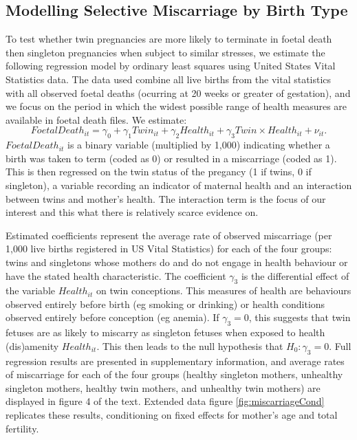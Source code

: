 \documentclass{nature}
\begin{document}
\begin{linenumbers}
\subsection{Modelling Selective Miscarriage by Birth Type}
To test whether twin  pregnancies are more likely to terminate in foetal death then singleton pregnancies when subject to similar stresses, we estimate the following regression model by ordinary least squares using United States Vital Statistics data.  The data used combine all live births from the vital statistics with all observed foetal deaths (ocurring at 20 weeks or greater of gestation), and we focus on the period in which the widest possible range of health measures are available in foetal death files.  We estimate:
\begin{equation}
FoetalDeath_{it} = \gamma_0 + \gamma_1 Twin_{it} + \gamma_2 Health_{it} + \gamma_3 Twin\times Health_{it} + \nu_{it}.
\end{equation}
$FoetalDeath_{it}$ is a binary variable (multiplied by 1,000) indicating whether a birth was taken to term (coded as 0) or resulted in a miscarriage (coded as 1). This is then regressed on the twin status of the pregancy (1 if twins, 0 if singleton), a variable recording an indicator of maternal health and an interaction between twins and mother's health. The interaction term is the focus of our interest and this what there is relatively scarce evidence on. 

Estimated coefficients represent the average rate of observed miscarriage (per 1,000 live births registered in US Vital Statistics) for each of the four groups: twins and singletons whose mothers do and do not engage in health behaviour or have the stated health characteristic. The coefficient $\gamma_3$ is the differential effect of the variable $Health_{it}$ on twin conceptions.  This measures of health are behaviours observed entirely before birth (eg smoking or drinking) or health conditions observed entirely before conception (eg anemia).  If $\gamma_3=0$, this suggests that twin fetuses are as likely to miscarry as singleton fetuses when exposed to health (dis)amenity $Health_{it}$.  This then leads to the null hypothesis that $H_0: \gamma_3=0$. Full regression results are presented in supplementary information, and average rates of miscarriage for each of the four groups (healthy singleton mothers, unhealthy singleton mothers, healthy twin mothers, and unhealthy twin mothers) are displayed in figure 4 of the text.  Extended data figure \ref{fig:miscarriageCond} replicates these results, conditioning on fixed effects for mother's age and total fertility.


\end{linenumbers}
\end{document}
